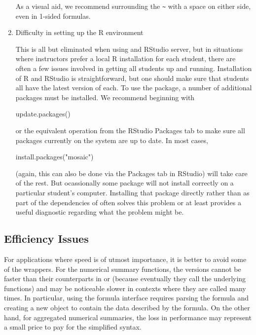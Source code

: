 \begin{enumerate}
  As a visual aid, we recommend surrounding the
  \texttt{\textasciitilde{}} with a space on either side, even in
  1-sided formulas.
\item
  Difficulty in setting up the R environment

  This is all but eliminated when using and RStudio server, but in
  situations where instructors prefer a local R installation for each
  student, there are often a few issues involved in getting all students
  up and running. Installation of R and RStudio is straightforward, but
  one should make sure that students all have the latest version of
  each. To use the  package, a number of additional packages
  must be installed. We recommend beginning with

  \begin{Schunk}
  \begin{Sinput}
  update.packages()
  \end{Sinput}
  \end{Schunk}

  or the equivalent operation from the RStudio Packages tab to make sure
  all packages currently on the system are up to date. In most cases,

  \begin{Schunk}
  \begin{Sinput}
  install.packages("mosaic")
  \end{Sinput}
  \end{Schunk}

  (again, this can also be done via the Packages tab in RStudio) will
  take care of the rest. But ocassionally some package will not install
  correctly on a particular student's computer. Installing that package
  directly rather than as part of the dependencies of  often
  solves this problem or at least provides a useful diagnostic regarding
  what the problem might be.
\end{enumerate}

\subsection{Efficiency Issues}\label{efficiency-issues}

For applications where speed is of utmost importance, it is better to
avoid some of the  wrappers. For the numerical summary
functions, the  versions cannot be faster than their
counterparts in  or  (because eventually they call
the underlying functions) and may be noticeable slower in contexts where
they are called many times. In particular, using the formula interface
requires parsing the formula and creating a new object to contain the
data described by the formula. On the other hand, for aggregated
numerical summaries, the loss in performance may represent a small price
to pay for the simplified syntax.

